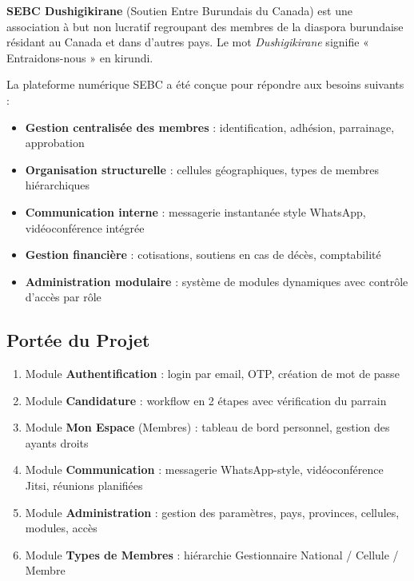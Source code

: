 \documentclass[12pt,a4paper]{article}
\begin{document}
\textbf{SEBC Dushigikirane} (Soutien Entre Burundais du Canada) est une association à but non lucratif regroupant des membres de la diaspora burundaise résidant au Canada et dans d'autres pays. Le mot \textit{Dushigikirane} signifie « Entraidons-nous » en kirundi.

La plateforme numérique SEBC a été conçue pour répondre aux besoins suivants :

\begin{itemize}[leftmargin=2em]
    \item \textbf{Gestion centralisée des membres} : identification, adhésion, parrainage, approbation
    \item \textbf{Organisation structurelle} : cellules géographiques, types de membres hiérarchiques
    \item \textbf{Communication interne} : messagerie instantanée style WhatsApp, vidéoconférence intégrée
    \item \textbf{Gestion financière} : cotisations, soutiens en cas de décès, comptabilité
    \item \textbf{Administration modulaire} : système de modules dynamiques avec contrôle d'accès par rôle
\end{itemize}

\subsection{Portée du Projet}

\begin{infobox}
\begin{enumerate}[leftmargin=1.5em]
    \item Module \textbf{Authentification} : login par email, OTP, création de mot de passe
    \item Module \textbf{Candidature} : workflow en 2 étapes avec vérification du parrain
    \item Module \textbf{Mon Espace} (Membres) : tableau de bord personnel, gestion des ayants droits
    \item Module \textbf{Communication} : messagerie WhatsApp-style, vidéoconférence Jitsi, réunions planifiées
    \item Module \textbf{Administration} : gestion des paramètres, pays, provinces, cellules, modules, accès
    \item Module \textbf{Types de Membres} : hiérarchie Gestionnaire National / Cellule / Membre
\end{enumerate}
\end{infobox}
\end{document}
